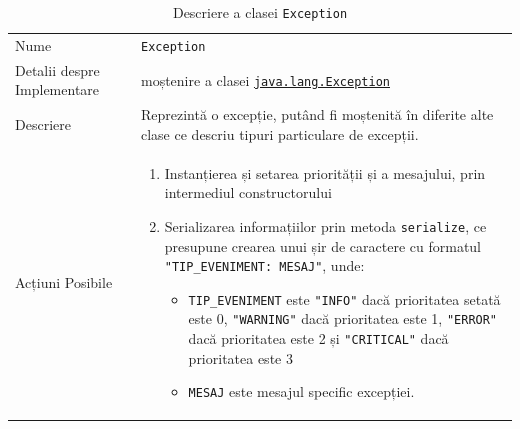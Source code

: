 \documentclass[12pt]{article}
\begin{document}
\begin{table}[H]
    \centering
    \begin{tabular}{ |p{0.25\linewidth} | p{0.75\linewidth}| } 
        \hline
        Nume & \texttt{Exception} \\
        Detalii despre Implementare & moștenire a clasei \href{https://docs.oracle.com/javase/7/docs/api/java/lang/Exception.html}{\texttt{java.lang.Exception}} \\
        Descriere & Reprezintă o excepție, putând fi moștenită în diferite alte clase ce descriu tipuri particulare de excepții. \\
        Acțiuni Posibile & \begin{enumerate}
                               \item Instanțierea și setarea priorității și a mesajului, prin intermediul constructorului
                               \item Serializarea informațiilor prin metoda \texttt{serialize}, ce presupune crearea unui șir de caractere cu formatul \texttt{"TIP_EVENIMENT: MESAJ"}, unde:
                                   \begin{itemize}
                                       \item \texttt{TIP_EVENIMENT} este \texttt{"INFO"} dacă prioritatea setată este 0, \texttt{"WARNING"} dacă prioritatea este 1, \texttt{"ERROR"} dacă prioritatea este 2 și \texttt{"CRITICAL"} dacă prioritatea este 3
                                       \item \texttt{MESAJ} este mesajul specific excepției.
                                   \end{itemize}
                           \end{enumerate} \\
    
        \hline
    \end{tabular}
    \caption{Descriere a clasei \texttt{Exception}}
    \label{table:1}
\end{table}

\newpage
\end{document}
